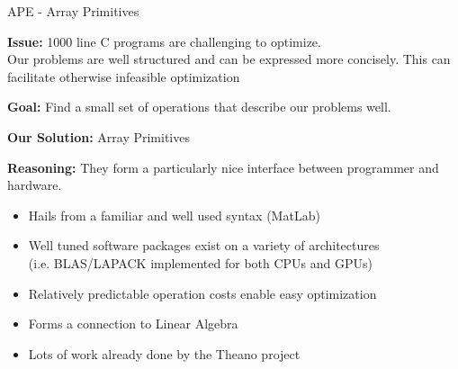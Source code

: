 \documentclass[9pt, compress, blue]{beamer}
\begin{document}
\begin{frame}{APE - Array Primitives}

\textbf{Issue:} 1000 line C programs are challenging to optimize. \\
Our problems are well structured and can be expressed more concisely.
This can facilitate otherwise infeasible optimization
\vspace{10pt}

\textbf{Goal:} Find a small set of operations that describe our problems well.
\vspace{10pt}

\textbf{Our Solution:} Array Primitives 
\vspace{10pt}

\textbf{Reasoning:} They form a particularly nice interface between
programmer and hardware. 
\begin{itemize}
\item Hails from a familiar and well used syntax (MatLab)
\item Well tuned software packages exist on a variety of architectures \\
(i.e. BLAS/LAPACK implemented for both CPUs and GPUs) 
\item Relatively predictable operation costs enable easy optimization 
\item Forms a connection to Linear Algebra
\item Lots of work already done by the Theano project
\end{itemize}

\end{frame}
\end{document}
